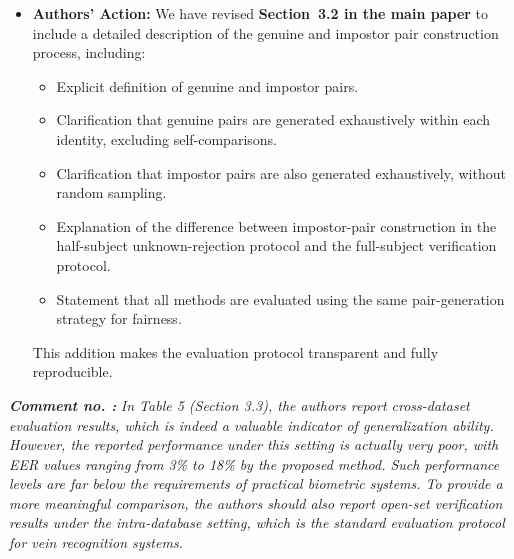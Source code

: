 \documentclass[11pt]{article}
\theoremstyle{remark}
\newcounter{mycounter} %
\newcommand\showReviewcounter{\stepcounter{mycounter}\themycounter}
\begin{document}
\begin{itemize}
	All methods are evaluated using the same protocol and the same genuine/impostor score-generation strategy under each setting. No method-specific sampling, filtering, or pair selection is applied. This ensures that the reported comparisons are fair, transparent, and reproducible.

	\item \textbf{Authors' Action:} 
	We have revised \textbf{Section~3.2 in the main paper} to include a detailed description of the genuine and impostor pair construction process, including:
	\begin{itemize}
	    \item Explicit definition of genuine and impostor pairs.
	    \item Clarification that genuine pairs are generated exhaustively within each identity, excluding self-comparisons.
	    \item Clarification that impostor pairs are also generated exhaustively, without random sampling.
	    \item Explanation of the difference between impostor-pair construction in the half-subject unknown-rejection protocol and the full-subject verification protocol.
	    \item Statement that all methods are evaluated using the same pair-generation strategy for fairness.
	\end{itemize}

	This addition makes the evaluation protocol transparent and fully reproducible.
\end{itemize}

\color{blue} 
\textbf{\textit{Comment no. \showReviewcounter:}} 
\textit{In Table 5 (Section 3.3), the authors report cross-dataset evaluation results, which is indeed a valuable indicator of generalization ability. However, the reported performance under this setting is actually very poor, with EER values ranging from 3\% to 18\% by the proposed method. Such performance levels are far below the requirements of practical biometric systems. To provide a more meaningful comparison, the authors should also report open-set verification results under the intra-database setting, which is the standard evaluation protocol for vein recognition systems.}
\color{black}
\end{document}
